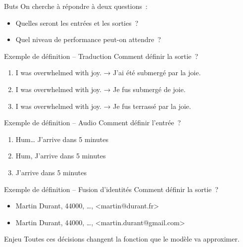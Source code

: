 \begin{frame}{Buts}
  On cherche à répondre à deux questions~:
  \begin{itemize}
    \item Quelles seront les entrées et les sorties~?
    \item Quel niveau de performance peut-on attendre~?
  \end{itemize}
\end{frame}

\begin{frame}{Exemple de définition – Traduction}
  Comment définir la sortie~?
  \begin{enumerate}
    \item I was overwhelmed with joy. → J'ai été submergé par la joie.
    \item I was overwhelmed with joy. → Je fus submergé de joie.
    \item I was overwhelmed with joy. → Je fus terrassé par la joie.
  \end{enumerate}
\end{frame}

\begin{frame}{Exemple de définition – Audio}
  Comment définir l'entrée~?
  \begin{enumerate}
    \item Hum… J'arrive dans 5 minutes
    \item Hum, J'arrive dans 5 minutes
    \item J'arrive dans 5 minutes
  \end{enumerate}
\end{frame}

\begin{frame}{Exemple de définition – Fusion d'identités}
  Comment définir la sortie~?
  \begin{itemize}
    \item Martin Durant, 44000, …, <martin@durant.fr>
    \item Martin Durant, 44000, …, <martin.durant@gmail.com>
  \end{itemize}
\end{frame}

\begin{frame}{Enjeu}
  Toutes ces décisions changent la fonction que le modèle va approximer.
\end{frame}